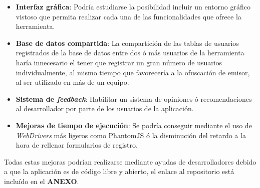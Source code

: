 \begin{itemize}
	\item \textbf{Interfaz gráfica}: Podría estudiarse la posibilidad incluir un entorno gráfico vistoso que permita realizar cada una de las funcionalidades que ofrece la herramienta.
	\item \textbf{Base de datos compartida}: La compartición de las tablas de usuarios registrados de la base de datos entre dos ó más usuarios de la herramienta haría innecesario el tener que registrar un gran número de usuarios individualmente, al mismo tiempo que favorecería a la ofuscación de emisor, al ser utilizado en más de un equipo.
	\item \textbf{Sistema de \textit{feedback}}: Habilitar un sistema de opiniones ó recomendaciones al desarrollador por parte de los usuarios de la aplicación.	
	\item \textbf{Mejoras de tiempo de ejecución}: Se podría conseguir mediante el uso de \textit{WebDrivers} más ligeros como PhantomJS ó la disminución del retardo a la hora de rellenar formularios de registro.	
	
\end{itemize}


Todas estas mejoras podrían realizarse mediante ayudas de desarrolladores debido a que la aplicación es de código libre y abierto, el enlace al repositorio está incluído en el \textbf{ANEXO}.

\newpage \thispagestyle{empty} %